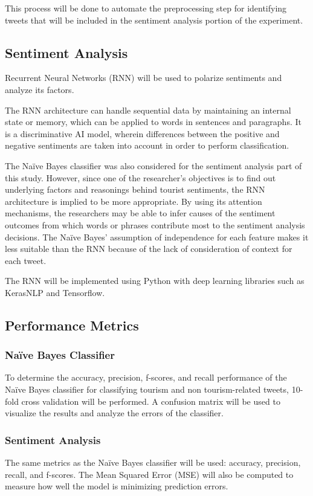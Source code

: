 \documentclass[journal]{./IEEE/IEEEtran}
\begin{document}
	This process will be done to automate the preprocessing step for identifying tweets that will be included in the sentiment analysis portion of the experiment.

\subsection{Sentiment Analysis}
Recurrent Neural Networks (RNN) will be used to polarize sentiments and analyze its factors. 

The RNN architecture can handle sequential data by maintaining an internal state or memory, which can be applied to words in sentences and paragraphs. It is a discriminative AI model, wherein differences between the positive and negative sentiments are taken into account in order to perform classification. \cite{eleven:geeksforgeeks-rnn-text-classification} 

The Naïve Bayes classifier was also considered for the sentiment analysis part of this study. However, since one of the researcher’s objectives is to find out underlying factors and reasonings behind tourist sentiments, the RNN architecture is implied to be more appropriate. By using its attention mechanisms, the researchers may be able to infer causes of the sentiment outcomes from which words or phrases contribute most to the sentiment analysis decisions. The Naïve Bayes’ assumption of independence for each feature makes it less suitable than the RNN because of the lack of consideration of context for each tweet.

The RNN will be implemented using Python with deep learning libraries such as KerasNLP and Tensorflow. 

\subsection{Performance Metrics}
\subsubsection{Naïve Bayes Classifier}
To determine the accuracy, precision, f-scores, and recall performance of the Naïve Bayes classifier for classifying tourism and non tourism-related tweets, 10-fold cross validation will be performed. A confusion matrix will be used to visualize the results and analyze the errors of the classifier. 
\subsubsection{Sentiment Analysis}
The same metrics as the Naïve Bayes classifier will be used: accuracy, precision, recall, and f-scores. The Mean Squared Error (MSE) will also be computed to measure how well the model is minimizing prediction errors. 
\end{document}
